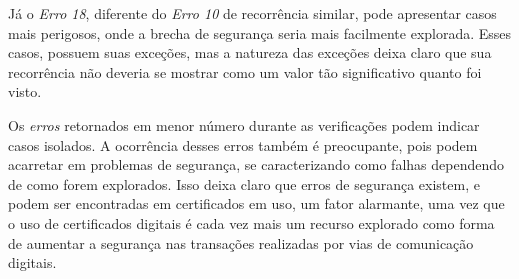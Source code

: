 	Já o \textit{Erro 18}, diferente do \textit{Erro 10} de recorrência similar, pode apresentar casos mais perigosos, onde a brecha de segurança seria mais facilmente explorada. Esses casos, possuem suas exceções, mas a natureza das exceções deixa claro que sua recorrência não deveria se mostrar como um valor tão significativo quanto foi visto.

	Os \textit{erros} retornados em menor número durante as verificações podem indicar casos isolados. A ocorrência desses erros também é preocupante, pois podem acarretar em problemas de segurança, se caracterizando como falhas dependendo de como forem explorados. Isso deixa claro que erros de segurança existem, e podem ser encontradas em certificados em uso, um fator alarmante, uma vez que o uso de certificados digitais é cada vez mais um recurso explorado como forma de aumentar a segurança nas transações realizadas por vias de comunicação digitais.
